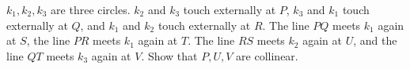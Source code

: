 $k_1, k_2, k_3$ are three circles. $k_2$ and $k_3$ touch externally at $P$, $k_3$ and $k_1$ touch externally at $Q$, and $k_1$ and $k_2$ touch externally at $R$. The line $PQ$ meets $k_1$ again at $S$, the line $PR$ meets $k_1$ again at $T$. The line $RS$ meets $k_2$ again at $U$, and the line $QT$ meets $k_3$ again at $V$. Show that $P, U, V$ are collinear.